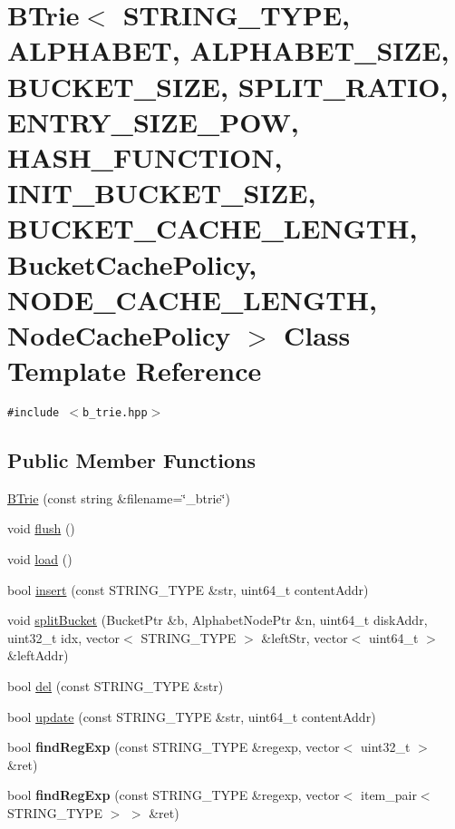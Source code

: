 \hypertarget{classBTrie}{
\section{BTrie$<$ STRING\_\-TYPE, ALPHABET, ALPHABET\_\-SIZE, BUCKET\_\-SIZE, SPLIT\_\-RATIO, ENTRY\_\-SIZE\_\-POW, HASH\_\-FUNCTION, INIT\_\-BUCKET\_\-SIZE, BUCKET\_\-CACHE\_\-LENGTH, BucketCachePolicy, NODE\_\-CACHE\_\-LENGTH, NodeCachePolicy $>$ Class Template Reference}
\label{classBTrie}
}
{\tt \#include $<$b\_\-trie.hpp$>$}

\subsection*{Public Member Functions}
\begin{CompactItemize}
\item 
\hyperlink{classBTrie_3cc0735f4735169d28c2fdc3c052ad7f}{BTrie} (const string \&filename=\char`\"{}\_\-btrie\char`\"{})
\item 
void \hyperlink{classBTrie_bfa4a5883b5b6146af18c53a35e85b34}{flush} ()
\item 
void \hyperlink{classBTrie_8808c1f6c8b72d7b72b70646ec661837}{load} ()
\item 
bool \hyperlink{classBTrie_7cec73d8ae32a6d049f3e801f6ee75f3}{insert} (const STRING\_\-TYPE \&str, uint64\_\-t contentAddr)
\item 
void \hyperlink{classBTrie_3e3f5765235c78ab56663a0852c1178d}{splitBucket} (BucketPtr \&b, AlphabetNodePtr \&n, uint64\_\-t diskAddr, uint32\_\-t idx, vector$<$ STRING\_\-TYPE $>$ \&leftStr, vector$<$ uint64\_\-t $>$ \&leftAddr)
\item 
bool \hyperlink{classBTrie_8f000cc39b2de657cd7817690437f54d}{del} (const STRING\_\-TYPE \&str)
\item 
bool \hyperlink{classBTrie_7557a9c4d0eb728ca0bcbd417d922f17}{update} (const STRING\_\-TYPE \&str, uint64\_\-t contentAddr)
\item 
\hypertarget{classBTrie_b9b758f3217a31d8e66dede82b742cda}{
bool \textbf{findRegExp} (const STRING\_\-TYPE \&regexp, vector$<$ uint32\_\-t $>$ \&ret)}
\label{classBTrie_b9b758f3217a31d8e66dede82b742cda}

\item 
\hypertarget{classBTrie_ed05bb9612951db278a752c8a9818ba5}{
bool \textbf{findRegExp} (const STRING\_\-TYPE \&regexp, vector$<$ item\_\-pair$<$ STRING\_\-TYPE $>$ $>$ \&ret)}
\label{classBTrie_ed05bb9612951db278a752c8a9818ba5}


\end{CompactItemize}
